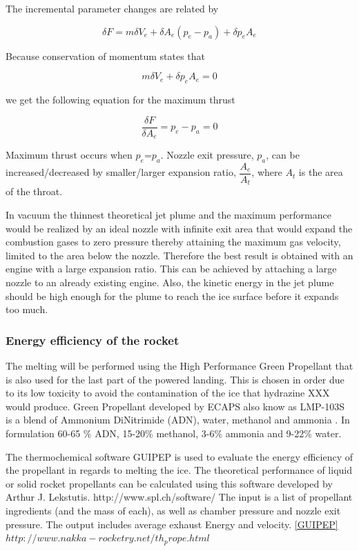 The incremental parameter changes are related by

\begin{equation}
\delta F=m\delta V_e +\delta A_e(p_e-p_a) +\delta p_e A_e
\end{equation}

Because conservation of momentum states that 

\begin{equation}
m\delta V_e+\delta p_e A_e=0
\end{equation}

we get the following equation for the maximum thrust

\begin{equation}
\dfrac{\delta F}{\delta A_e}=p_e-p_a=0 
\end{equation}

Maximum thrust occurs when $p_e$=$p_a$. Nozzle exit pressure, $p_a$, can be increased/decreased by smaller/larger expansion ratio, $\dfrac{A_e}{A_t}$, where $A_t$ is the area of the throat. 

In vacuum the thinnest theoretical jet plume and the maximum performance would be realized by an ideal nozzle with infinite exit area that would expand the combustion gases to zero pressure thereby attaining the maximum gas velocity, limited to the area below the nozzle. Therefore the best result is obtained with an engine with a large expansion ratio. This can be achieved by attaching a large nozzle to an already existing engine. Also, the kinetic energy in the jet plume should be high enough for the plume to reach the ice surface before it expands too much. 




\subsubsection{Energy efficiency of the rocket}

The melting will be performed using the High Performance Green Propellant that is also used for the last part of the powered landing. This is chosen in order due to its low toxicity to avoid the contamination of the ice that hydrazine XXX would produce. Green Propellant developed by ECAPS also know as LMP-103S is a blend of Ammonium DiNitrimide (ADN), water, methanol and ammonia \cite{Walter_2014}. In formulation 60-65 \% ADN, 15-20\% methanol, 3-6\% ammonia and 9-22\% water. \cite{Taylor_2013}

The thermochemical software GUIPEP is used to evaluate the energy efficiency of the propellant in regards to melting the ice. The theoretical performance of liquid or solid rocket propellants can be calculated using this software developed by Arthur J. Lekstutis. http://www.spl.ch/software/ The input is a list of propellant ingredients (and the mass of each), as well as chamber pressure and nozzle exit pressure. The output includes average exhaust Energy and velocity. \ref{GUIPEP} $http://www.nakka-rocketry.net/th_prope.html$

